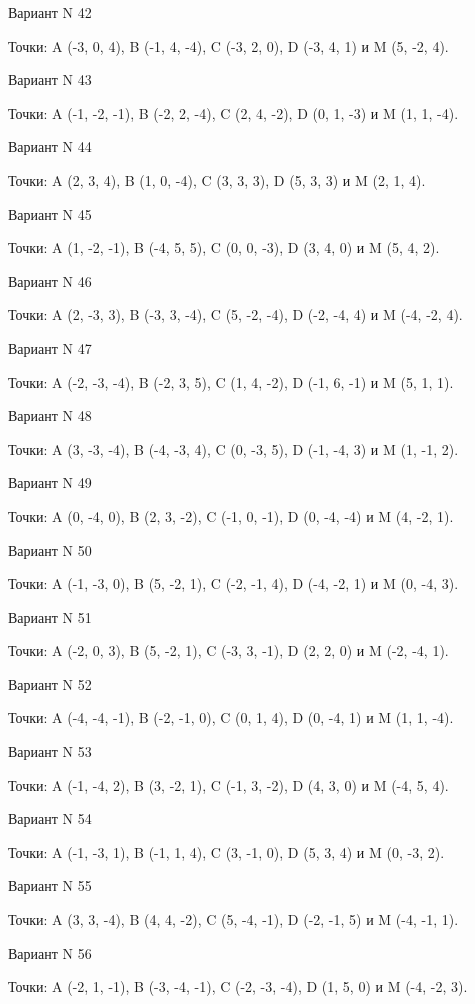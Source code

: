 \documentclass[11pt]{report}
\begin{document}
Вариант N 42

Точки: A (-3, 0, 4), B (-1, 4, -4), C (-3, 2, 0), D (-3, 4, 1) и M (5, -2, 4).

Вариант N 43

Точки: A (-1, -2, -1), B (-2, 2, -4), C (2, 4, -2), D (0, 1, -3) и M (1, 1, -4).

Вариант N 44

Точки: A (2, 3, 4), B (1, 0, -4), C (3, 3, 3), D (5, 3, 3) и M (2, 1, 4).

Вариант N 45

Точки: A (1, -2, -1), B (-4, 5, 5), C (0, 0, -3), D (3, 4, 0) и M (5, 4, 2).

Вариант N 46

Точки: A (2, -3, 3), B (-3, 3, -4), C (5, -2, -4), D (-2, -4, 4) и M (-4, -2, 4).
\newpage


Вариант N 47

Точки: A (-2, -3, -4), B (-2, 3, 5), C (1, 4, -2), D (-1, 6, -1) и M (5, 1, 1).

Вариант N 48

Точки: A (3, -3, -4), B (-4, -3, 4), C (0, -3, 5), D (-1, -4, 3) и M (1, -1, 2).

Вариант N 49

Точки: A (0, -4, 0), B (2, 3, -2), C (-1, 0, -1), D (0, -4, -4) и M (4, -2, 1).

Вариант N 50

Точки: A (-1, -3, 0), B (5, -2, 1), C (-2, -1, 4), D (-4, -2, 1) и M (0, -4, 3).

Вариант N 51

Точки: A (-2, 0, 3), B (5, -2, 1), C (-3, 3, -1), D (2, 2, 0) и M (-2, -4, 1).

Вариант N 52

Точки: A (-4, -4, -1), B (-2, -1, 0), C (0, 1, 4), D (0, -4, 1) и M (1, 1, -4).

Вариант N 53

Точки: A (-1, -4, 2), B (3, -2, 1), C (-1, 3, -2), D (4, 3, 0) и M (-4, 5, 4).

Вариант N 54

Точки: A (-1, -3, 1), B (-1, 1, 4), C (3, -1, 0), D (5, 3, 4) и M (0, -3, 2).

Вариант N 55

Точки: A (3, 3, -4), B (4, 4, -2), C (5, -4, -1), D (-2, -1, 5) и M (-4, -1, 1).

Вариант N 56

Точки: A (-2, 1, -1), B (-3, -4, -1), C (-2, -3, -4), D (1, 5, 0) и M (-4, -2, 3).
\end{document}
